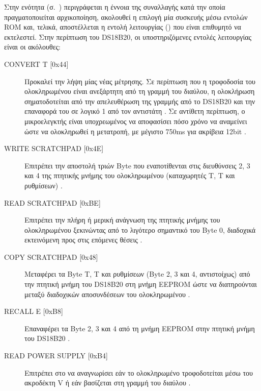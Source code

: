 Στην ενότητα  (σ.~\pageref{subsec:1-wire}) περιγράφεται η
έννοια της συναλλαγής κατά την οποία πραγματοποιείται αρχικοποίηση, ακολουθεί η
επιλογή μία συσκευής  μέσω εντολών ROM και, τελικά, αποστέλλεται η
εντολή λειτουργίας () που είναι επιθυμητό να εκτελεστεί.
Στην περίπτωση του DS18B20, οι υποστηριζόμενες εντολές λειτουργίας είναι οι
ακόλουθες:
\begin{description}
    \item[CONVERT T [0x44{]}] Προκαλεί την λήψη μίας νέας μέτρησης. Σε περίπτωση
    που η τροφοδοσία του ολοκληρωμένου είναι ανεξάρτητη από τη γραμμή του
    διαύλου, η ολοκλήρωση σηματοδοτείται από την απελευθέρωση της γραμμής από
    το DS18B20 και την επαναφορά του σε λογικό 1 από τον αντιστάτη 
    \parencite[11]{ds18b20}. Σε αντίθετη περίπτωση, ο μικροελεγκτής είναι
    υποχρεωμένος να αποφασίσει πόσο χρόνο να αναμείνει ώστε να ολοκληρωθεί η
    μετατροπή, με μέγιστο 750ms για ακρίβεια 12bit \parencite[8,11]{ds18b20}.

    \item[WRITE SCRATCHPAD [0x4E{]}] Επιτρέπει την αποστολή τριών Byte που
    εναποτίθενται στις διευθύνσεις 2, 3 και 4 της πτητικής μνήμης του
    ολοκληρωμένου (καταχωρητές T, T και ρυθμίσεων)
    \parencite[11]{ds18b20}.

    \item[READ SCRATCHPAD [0xBE{]}] Επιτρέπει την πλήρη ή μερική ανάγνωση της
    πτητικής μνήμης του ολοκληρωμένου ξεκινώντας από το λιγότερο σημαντικό
     του Byte 0, διαδοχικά εκτεινόμενη προς στις επόμενες θέσεις
    \parencite[11]{ds18b20}.

    \item[COPY SCRATCHPAD [0x48{]}] Μεταφέρει τα Byte T, T και
    ρυθμίσεων (Byte 2, 3 και 4, αντιστοίχως) από την πτητική μνήμη του DS18B20
    στη μνήμη EEPROM ώστε να διατηρούνται μεταξύ διαδοχικών αποσυνδέσεων του
    ολοκληρωμένου \parencite[12]{ds18b20}.

    \item[RECALL E\protect{} [0xB8{]}] Επαναφέρει τα Byte 2, 3 και 4 από
    τη μνήμη EEPROM στην πτητική μνήμη του DS18B20 \parencite[12]{ds18b20}.

    \item[READ POWER SUPPLY [0xB4{]}] Επιτρέπει στο  να αναγνωρίσει
    εάν το ολοκληρωμένο τροφοδοτείται μέσω του ακροδέκτη V ή εάν
    βασίζεται στη γραμμή του διαύλου \parencite[12]{ds18b20}.
\end{description}

